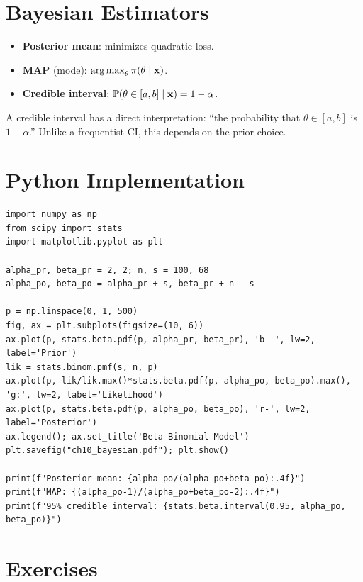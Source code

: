 \section{Bayesian Estimators}

\begin{definition}
\begin{itemize}
\item \textbf{Posterior mean}: minimizes quadratic loss.
\item \textbf{MAP} (mode): $\operatorname*{arg\,max}_\theta\pi(\theta\mid\mathbf{x})$.
\item \textbf{Credible interval}: $\mathbb{P}(\theta\in[a,b]\mid\mathbf{x})=1-\alpha$.
\end{itemize}
\end{definition}

\begin{warning}
A credible interval has a direct interpretation: ``the probability that $\theta\in[a,b]$ is $1-\alpha$.'' Unlike a frequentist CI, this depends on the prior choice.
\end{warning}

\section{Python Implementation}

\begin{python}
\begin{verbatim}
import numpy as np
from scipy import stats
import matplotlib.pyplot as plt

alpha_pr, beta_pr = 2, 2; n, s = 100, 68
alpha_po, beta_po = alpha_pr + s, beta_pr + n - s

p = np.linspace(0, 1, 500)
fig, ax = plt.subplots(figsize=(10, 6))
ax.plot(p, stats.beta.pdf(p, alpha_pr, beta_pr), 'b--', lw=2, label='Prior')
lik = stats.binom.pmf(s, n, p)
ax.plot(p, lik/lik.max()*stats.beta.pdf(p, alpha_po, beta_po).max(), 'g:', lw=2, label='Likelihood')
ax.plot(p, stats.beta.pdf(p, alpha_po, beta_po), 'r-', lw=2, label='Posterior')
ax.legend(); ax.set_title('Beta-Binomial Model')
plt.savefig("ch10_bayesian.pdf"); plt.show()

print(f"Posterior mean: {alpha_po/(alpha_po+beta_po):.4f}")
print(f"MAP: {(alpha_po-1)/(alpha_po+beta_po-2):.4f}")
print(f"95% credible interval: {stats.beta.interval(0.95, alpha_po, beta_po)}")
\end{verbatim}
\end{python}

\section{Exercises}

